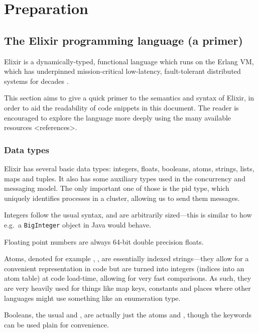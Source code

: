 \chapter{Preparation}\label{ch:prep}

\section{The Elixir programming language (a primer)}\label{sec:prep:elixir}


Elixir is a dynamically-typed, functional language which runs on the Erlang VM, which has underpinned mission-critical low-latency, fault-tolerant distributed systems for decades \cite{scalability_erlang_otp}.

This section aims to give a quick primer to the semantics and syntax of Elixir, in order to aid the readability of code snippets in this document.
The reader is encouraged to explore the language more deeply using the many available resources <references>.

\subsection{Data types}
Elixir has several basic data types: integers, floats, booleans, atoms, strings, lists, maps and tuples.
It also has some auxiliary types used in the concurrency and messaging model.
The only important one of those is the pid type, which uniquely identifies processes in a cluster, allowing us to send them messages.

Integers follow the usual syntax, and are arbitrarily sized---this is similar to how e.g.\ a \verb|BigInteger| object in Java would behave.

Floating point numbers are always 64-bit double precision floats.

Atoms, denoted for example , ,  are essentially indexed strings---they allow for a convenient representation in code but are turned into integers (indices into an atom table) at code load-time, allowing for very fast comparisons.
As such, they are very heavily used for things like map keys, constants and places where other languages might use something like an enumeration type.

Booleans, the usual  and , are actually just the atoms  and , though the keywords can be used plain for convenience.

